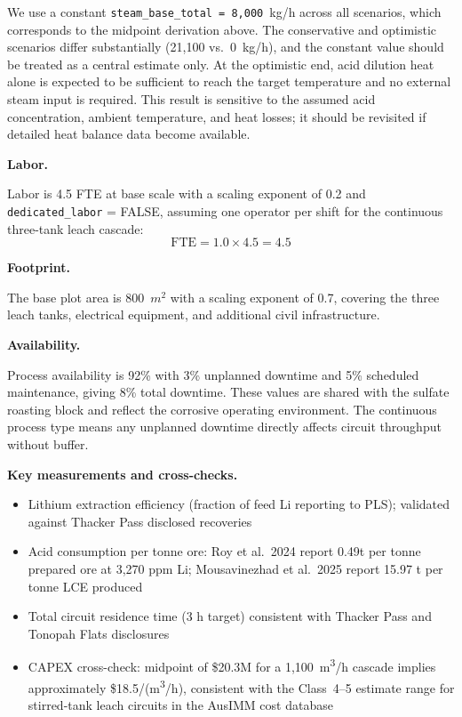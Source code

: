 We use a constant \texttt{steam\_base\_total = 8,000}~kg/h across all scenarios, which corresponds to the midpoint derivation above. The conservative and optimistic scenarios differ substantially (21,100 vs.\ 0~kg/h), and the constant value should be treated as a central estimate only. At the optimistic end, acid dilution heat alone is expected to be sufficient to reach the target temperature and no external steam input is required. This result is sensitive to the assumed acid concentration, ambient temperature, and heat losses; it should be revisited if detailed heat balance data become available.

\medskip
\noindent\textbf{Labor.}\quad

Labor is 4.5 FTE at base scale with a scaling exponent of 0.2 and \texttt{dedicated\_labor} = FALSE, assuming one operator per shift for the continuous three-tank leach cascade:
\[
	\text{FTE} = 1.0 \times 4.5 = 4.5
\]

\medskip
\noindent\textbf{Footprint.}\quad

The base plot area is 800~$\si{m^2}$ with a scaling exponent of 0.7, covering the three leach tanks, electrical equipment, and additional civil infrastructure.

\medskip
\noindent\textbf{Availability.}\quad

Process availability is 92\% with 3\% unplanned downtime and 5\% scheduled maintenance, giving 8\% total downtime. These values are shared with the sulfate roasting block and reflect the corrosive operating environment. The continuous process type means any unplanned downtime directly affects circuit throughput without buffer.

\medskip
\noindent\textbf{Key measurements and cross-checks.}\quad
\begin{itemize}[noitemsep]
    \item Lithium extraction efficiency (fraction of feed Li reporting to PLS); validated against Thacker Pass disclosed recoveries
    \item Acid consumption per tonne ore: Roy et al.\ 2024 report 0.49t  per tonne prepared ore at 3,270 ppm Li; Mousavinezhad et al.\ 2025 report 15.97 t  per tonne LCE produced
    \item Total circuit residence time (3 h target) consistent with Thacker Pass and Tonopah Flats disclosures
    \item CAPEX cross-check: midpoint of \$20.3M for a 1,100~\si{m^3}/h cascade implies approximately \$18.5/(\si{m^3}/h), consistent with the Class~4--5 estimate range for stirred-tank leach circuits in the AusIMM cost database
\end{itemize}

